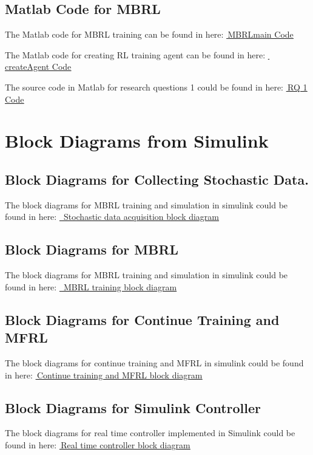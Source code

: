 \subsection*{Matlab Code for MBRL}
\label{code:mbrl}
The Matlab code for MBRL training can be found in here: \href{https://github.com/n7729697/KTH-MasterThesis/blob/main/code/MBRLmain.mlx}{\faGithub\,\underline{MBRLmain Code}}

The Matlab code for creating RL training agent can be found in here: \href{https://github.com/n7729697/KTH-MasterThesis/blob/main/code/createAgent.mlx}{\faGithub\,\underline{createAgent Code}}

The source code in Matlab for research questions 1 could be found in here: \href{https://github.com/n7729697/KTH-MasterThesis/blob/main/code/createAgent.mlx}{\faGithub\,\underline{RQ 1 Code}}

\section{Block Diagrams from Simulink}
\subsection*{Block Diagrams for Collecting Stochastic Data.}
The block diagrams for MBRL training and simulation in simulink could be found in here: \href{https://github.com/n7729697/KTH-MasterThesis/blob/main/img/AppB/ModelRobot.pdf}{\faGithub\,\underline{ Stochastic data acquisition block diagram}}
\subsection*{Block Diagrams for MBRL}
The block diagrams for MBRL training and simulation in simulink could be found in here: \href{https://github.com/n7729697/KTH-MasterThesis/blob/main/img/AppB/RLtrot.pdf}{\faGithub\,\underline{ MBRL training block diagram}}
\subsection*{Block Diagrams for Continue Training and MFRL}
The block diagrams for continue training and MFRL in simulink could be found in here: \href{https://github.com/n7729697/KTH-MasterThesis/blob/main/img/AppB/RLvali.pdf}{\faGithub\,\underline{Continue training and MFRL block diagram}}
\subsection*{Block Diagrams for Simulink Controller}
The block diagrams for real time controller implemented in Simulink could be found in here:  \href{https://github.com/n7729697/KTH-MasterThesis/blob/main/img/AppB/controller.pdf}{\faGithub\,\underline{Real time controller block diagram}}

